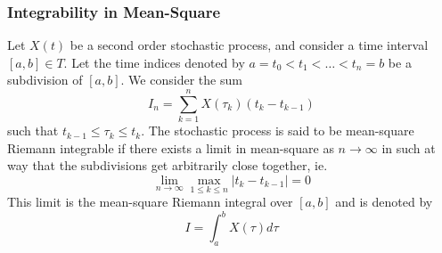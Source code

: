 \documentclass[11pt]{report} %
\begin{document}
\subsubsection{Integrability in Mean-Square}

Let $X\left(t\right)$ be a second order stochastic process, and consider a time interval $\left[a, b\right] \in T$. Let the time indices denoted by $a = t_{0} < t_{1} < \dots < t_{n} = b$ be a subdivision of $\left[a, b\right]$. We consider the sum
\begin{equation}
I_{n} = \sum_{k = 1}^{n}X\left(\tau_{k}\right)\left(t_{k} - t_{k - 1}\right)
\end{equation}
such that $t_{k - 1} \leq \tau_{k} \leq t_{k}$. The stochastic process is said to be mean-square Riemann integrable if there exists a limit in mean-square as $n \to \infty$ in such at way that the subdivisions get arbitrarily close together, ie.
\begin{equation}
\lim_{n \to \infty}\max_{1 \leq k \leq n}\left|t_{k} - t_{k - 1}\right| = 0
\end{equation}
This limit is the mean-square Riemann integral over $\left[a, b\right]$ and is denoted by
\begin{equation}
I = \int_{a}^{b}X\left(\tau\right)d\tau
\end{equation}
	
\end{document}
